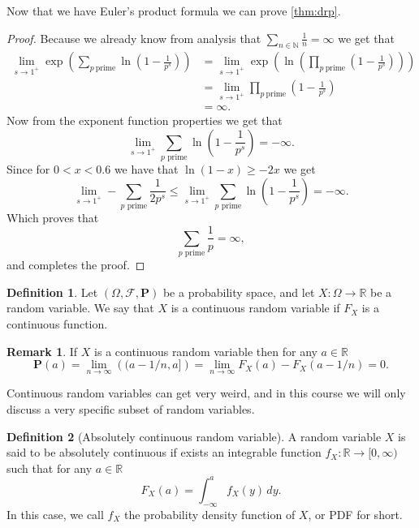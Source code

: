 \documentclass[11pt,a4paper]{article}
\theoremstyle{definition}
\newtheorem{definition}{Definition}[section]
\newtheorem{remark}{Remark}[section]
\theoremstyle{plain}
\newcommand{\N}{\mathbb{N}}
\newcommand{\R}{\mathbb{R}}
\newcommand{\Prob}{\mathbf{P}}
\begin{document}
  Now that we have Euler's product formula we can prove \autoref{thm:drp}.
  \begin{proof}
    Because we already know from analysis that 
    $\sum_{n \in \N} \frac 1n = \infty$ we get that
    \begin{align*}
      \lim_{s \to 1^+}
      \exp\left(\sum_{p \ \mathrm{prime}}
      \ln \left(1 - \frac{1}{p^{s}}\right)\right) &=
      \lim_{s \to 1^+}
      \exp \left(\ln\left(\prod_{p \ \mathrm{prime}}
      \left(1 - \frac{1}{p^{s}}\right)\right)\right) \\ &= 
      \lim_{s \to 1^+} 
      \prod_{p \ \mathrm{prime}} \left(1 - \frac{1}{p^{s}}\right) \\ &= 
      \infty.
    \end{align*}
    Now from the exponent function properties we get that
    \[
      \lim_{s \to 1^+} 
      \sum_{p \text{ prime}} \ln\left(1 - \frac{1}{p^{s}}\right) =
      - \infty.
    \]
    Since for $0 < x < 0.6$ we have that $\ln(1-x) \geq -2x$ we get
    \[
      \lim_{s \to 1^+}
      - \sum_{p \text{ prime}} \frac{1}{2 p^s} \le
      \lim_{s \to 1^+}
      \sum_{p \text{ prime}} \ln\left(1 - \frac{1}{p^{s}}\right) =
      - \infty.
    \]
    Which proves that
    \[
      \sum_{p \text{ prime}} \frac{1}{p} = \infty,
    \]
    and completes the proof.
  \end{proof}

  \begin{definition}
    Let $(\Omega, \mathcal F, \Prob)$ be a probability space,
    and let $X \colon \Omega \to \R$ be a random variable.
    We say that $X$ is a continuous random variable if $F_X$ is a
    continuous function.
  \end{definition}
  \begin{remark}
    If $X$ is a continuous random variable then for any $a \in \R$
    \[
      \Prob(a) = 
      \lim_{n \to \infty}\left((a - 1/n, a]\right) =
      \lim_{n \to \infty} F_X(a) - F_X(a - 1/n) =
      0.
    \]
  \end{remark}
  
  Continuous random variables can get very weird, and in this course we
  will only discuss a very specific subset of random variables.

  \begin{definition}[Absolutely continuous random variable]
    A random variable $X$ is said to be absolutely continuous if exists an
    integrable function $f_X \colon \R \to [0,\infty)$ such that for any
    $a \in \R$
    \[
      F_X(a) = \int_{-\infty}^{a} f_X(y)\,dy.
    \]
    In this case, we call $f_X$ the probability density function of $X$,
    or PDF for short.
  \end{definition}
  
\end{document}
